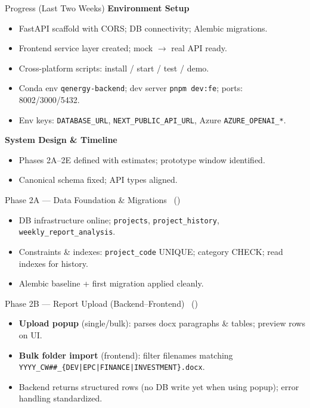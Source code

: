\documentclass [aspectratio=169]{beamer}
\begin{document}
\begin{frame}{Progress (Last Two Weeks)}
\textbf{Environment Setup}
\begin{itemize}
    \item FastAPI scaffold with CORS; DB connectivity; Alembic migrations.
    \item Frontend service layer created; mock $\rightarrow$ real API ready.
    \item Cross-platform scripts: install / start / test / demo.
    \item Conda env \texttt{qenergy-backend}; dev server \texttt{pnpm dev:fe}; ports: 8002/3000/5432.
    \item Env keys: \texttt{DATABASE\_URL}, \texttt{NEXT\_PUBLIC\_API\_URL}, Azure \texttt{AZURE\_OPENAI\_*}.
\end{itemize}
\vspace{0.4em}
\textbf{System Design \& Timeline}
\begin{itemize}
    \item Phases 2A–2E defined with estimates; prototype window identified.
    \item Canonical schema fixed; API types aligned.
\end{itemize}
\end{frame}

\begin{frame}{Phase 2A — Data Foundation \& Migrations \ (\checkmark)}
\begin{itemize}
    \item DB infrastructure online; \texttt{projects}, \texttt{project\_history}, \texttt{weekly\_report\_analysis}.
    \item Constraints \& indexes: \texttt{project\_code} UNIQUE; category CHECK; read indexes for history.
    \item Alembic baseline + first migration applied cleanly.
\end{itemize}
\end{frame}

\begin{frame}{Phase 2B — Report Upload (Backend–Frontend) \ (\checkmark)}
\begin{itemize}
    \item \textbf{Upload popup} (single/bulk): parses docx paragraphs \& tables; preview rows on UI.
    \item \textbf{Bulk folder import} (frontend): filter filenames matching \texttt{YYYY\_CW\#\#\_\{DEV|EPC|FINANCE|INVESTMENT\}.docx}.
    \item Backend returns structured rows (no DB write yet when using popup); error handling standardized.
\end{itemize}
\end{frame}
\end{document}
